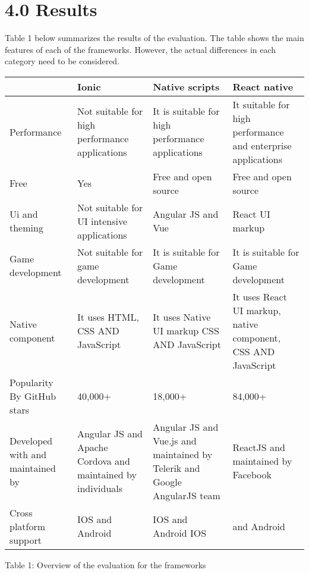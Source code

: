 \documentclass[12pt]{extreport}
\begin{document}
\section*{4.0 Results}
Table 1 below summarizes the results of the evaluation. The table shows the main features of each of the frameworks. However, the actual differences in each category need to be considered.

\begin{table}[!ht]
\begin{adjustwidth}{0in}{0in} %
\centering

\begingroup
\setlength{\tabcolsep}{4pt} %
\renewcommand{\arraystretch}{1.5} %
\begin{tabular}{|p{3cm}|p{4cm}|p{4cm}|p{4cm}|}
	\hline
	& Ionic & Native scripts & React native\\
	\hline
	Performance & Not suitable for high performance applications & It is suitable for high performance applications & It suitable for high performance and enterprise applications\\
	\hline
	Free & Yes & Free and open source & Free and open source\\
	\hline
	Ui and theming & Not suitable for UI intensive applications & Angular JS and Vue
	& React UI markup\\
	\hline
	Game development & Not suitable for game development & It is suitable for Game development & It is suitable for Game development\\
	\hline
	Native component & It uses HTML, CSS AND JavaScript & It uses Native UI markup CSS AND JavaScript & It uses React UI markup, native component, CSS AND JavaScript\\
	\hline
	Popularity By GitHub stars & 40,000+ & 18,000+ & 84,000+\\
	\hline
	Developed with and maintained by & Angular JS and Apache Cordova and maintained by individuals & Angular JS and Vue.js and maintained by Telerik and Google AngularJS team & ReactJS and maintained by Facebook\\
	\hline
	Cross platform support & IOS and Android & IOS and Android IOS & and Android\\
	\hline
	
\end{tabular}
\endgroup

\label{table1}Table 1: Overview of the evaluation for the frameworks
\end{adjustwidth}
\end{table}
\end{document}
